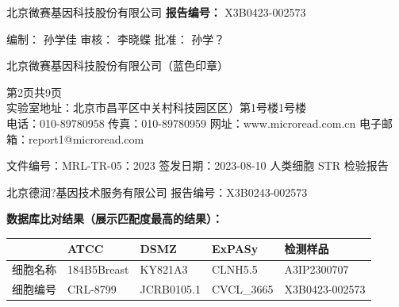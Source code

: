 \documentclass[UTF8,10pt,a4paper,fontset=fandol]{ctexart}
\newcommand{\fieldvalue}[1]{#1}
\newcommand{\handwritten}[1]{#1}
\begin{document}
\noindent
北京微赛基因科技股份有限公司
\hfill
\textbf{报告编号：}%
\fieldvalue{X3B0423-002573}

\vspace{0.5em}

\noindent
编制：%
\fieldvalue{\handwritten{孙学佳}}
\hfill
审核：%
\fieldvalue{\handwritten{李晓蝶}}
\hfill
批准：%
\fieldvalue{\handwritten{孙学？}}

\vspace{0.5em}

\noindent
北京微赛基因科技股份有限公司（蓝色印章）

\vfill

\begin{center}
\small
第2页共9页\\
实验室地址：北京市昌平区中关村科技园区区）第1号楼1号楼\\
电话：010-89780958 传真：010-89780959 网址：www.microread.com.cn 电子邮箱：report1@microread.com
\end{center}

\newpage

\noindent
文件编号：MRL-TR-05：2023 \hfill 签发日期：2023-08-10 \hfill 人类细胞 STR 检验报告

\noindent
北京德润?基因技术服务有限公司 \hfill 报告编号：X3B0243-002573

\begin{center}
\textbf{数据库比对结果（展示匹配度最高的结果）：}
\end{center}

\noindent
\begin{tabular}{|p{2.3cm}|p{2.3cm}|p{2.3cm}|p{2.3cm}|p{3.2cm}|}
\hline
 & ATCC & DSMZ & ExPASy & 检测样品 \\
\hline
细胞名称 & 184B5Breast & KY821A3 & CLNH5.5 & A3IP2300707 \\
\hline
细胞编号 & CRL-8799 & JCRB0105.1 & CVCL\_3665 & X3B0423-002573 \\
\hline
\end{tabular}

\vspace{0.3em}
\end{document}
